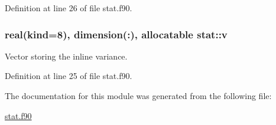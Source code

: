 Definition at line 26 of file stat.\-f90.

\hypertarget{classstat_ab2a3ce8c90189fdbd6bb313c75876473}{
\subsubsection[{v}]{\setlength{\rightskip}{0pt plus 5cm}real(kind=8), dimension(\-:), allocatable stat\-::v\hspace{0.3cm}{\ttfamily [private]}}}\label{classstat_ab2a3ce8c90189fdbd6bb313c75876473}


Vector storing the inline variance. 



Definition at line 25 of file stat.\-f90.



The documentation for this module was generated from the following file\-:\begin{DoxyCompactItemize}
\item 
\hyperlink{stat_8f90}{stat.\-f90}\end{DoxyCompactItemize}
